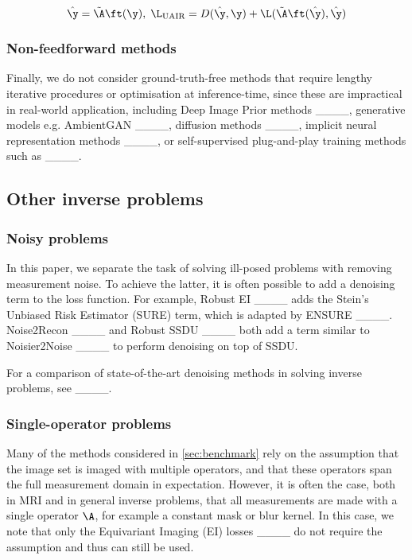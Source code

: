 \begin{equation}
    \hat\y=\tilde\A \ft(\y),\;\L_\text{UAIR}=D(\hat\y,\y)+\L(\tilde\A\ft(\hat\y),\hat\y)
    \label{eq:uair}    
\end{equation}

\subsubsection{Non-feedforward methods}

Finally, we do not consider ground-truth-free methods that require lengthy iterative procedures or optimisation at inference-time, since these are impractical in real-world application, including Deep Image Prior methods ____, generative models e.g. AmbientGAN ____, diffusion methods ____, implicit neural representation methods ____, or self-supervised plug-and-play training methods such as ____.

\subsection{Other inverse problems}
\label{sec:other_problems}
\subsubsection{Noisy problems}
\label{sec:noisy_problems}

In this paper, we separate the task of solving ill-posed problems with removing measurement noise. To achieve the latter, it is often possible to add a denoising term to the loss function. For example, Robust EI ____ adds the Stein's Unbiased Risk Estimator (SURE) term, which is adapted by ENSURE ____. Noise2Recon ____ and Robust SSDU ____ both add a term similar to Noisier2Noise ____ to perform denoising on top of SSDU.

For a comparison of state-of-the-art denoising methods in solving inverse problems, see ____.

\subsubsection{Single-operator problems}
\label{sec:single_operator}

Many of the methods considered in \cref{sec:benchmark} rely on the assumption that the image set is imaged with multiple operators, and that these operators span the full measurement domain in expectation. However, it is often the case, both in MRI and in general inverse problems, that all measurements are made with a single operator $\A$, for example a constant mask or blur kernel. In this case, we note that only the Equivariant Imaging (EI) losses ____ do not require the assumption and thus can still be used.
